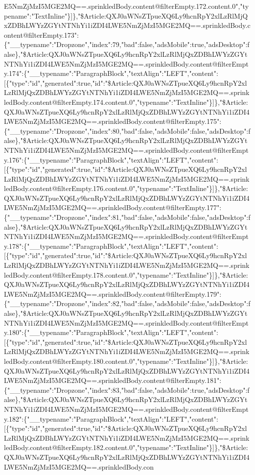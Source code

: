 E5NmZjMzI5MGE2MQ==.sprinkledBody.content@filterEmpty.172.content.0","typename":"TextInline"\}{]}\},"\$Article:QXJ0aWNsZTpueXQ6Ly9hcnRpY2xlLzRlMjQxZDBhLWYzZGYtNTNhYi1iZDI4LWE5NmZjMzI5MGE2MQ==.sprinkledBody.content@filterEmpty.173":\{"\_\_typename":"Dropzone","index":79,"bad":false,"adsMobile":true,"adsDesktop":false\},"\$Article:QXJ0aWNsZTpueXQ6Ly9hcnRpY2xlLzRlMjQxZDBhLWYzZGYtNTNhYi1iZDI4LWE5NmZjMzI5MGE2MQ==.sprinkledBody.content@filterEmpty.174":\{"\_\_typename":"ParagraphBlock","textAlign":"LEFT","content":{[}\{"type":"id","generated":true,"id":"\$Article:QXJ0aWNsZTpueXQ6Ly9hcnRpY2xlLzRlMjQxZDBhLWYzZGYtNTNhYi1iZDI4LWE5NmZjMzI5MGE2MQ==.sprinkledBody.content@filterEmpty.174.content.0","typename":"TextInline"\}{]}\},"\$Article:QXJ0aWNsZTpueXQ6Ly9hcnRpY2xlLzRlMjQxZDBhLWYzZGYtNTNhYi1iZDI4LWE5NmZjMzI5MGE2MQ==.sprinkledBody.content@filterEmpty.175":\{"\_\_typename":"Dropzone","index":80,"bad":false,"adsMobile":false,"adsDesktop":false\},"\$Article:QXJ0aWNsZTpueXQ6Ly9hcnRpY2xlLzRlMjQxZDBhLWYzZGYtNTNhYi1iZDI4LWE5NmZjMzI5MGE2MQ==.sprinkledBody.content@filterEmpty.176":\{"\_\_typename":"ParagraphBlock","textAlign":"LEFT","content":{[}\{"type":"id","generated":true,"id":"\$Article:QXJ0aWNsZTpueXQ6Ly9hcnRpY2xlLzRlMjQxZDBhLWYzZGYtNTNhYi1iZDI4LWE5NmZjMzI5MGE2MQ==.sprinkledBody.content@filterEmpty.176.content.0","typename":"TextInline"\}{]}\},"\$Article:QXJ0aWNsZTpueXQ6Ly9hcnRpY2xlLzRlMjQxZDBhLWYzZGYtNTNhYi1iZDI4LWE5NmZjMzI5MGE2MQ==.sprinkledBody.content@filterEmpty.177":\{"\_\_typename":"Dropzone","index":81,"bad":false,"adsMobile":false,"adsDesktop":false\},"\$Article:QXJ0aWNsZTpueXQ6Ly9hcnRpY2xlLzRlMjQxZDBhLWYzZGYtNTNhYi1iZDI4LWE5NmZjMzI5MGE2MQ==.sprinkledBody.content@filterEmpty.178":\{"\_\_typename":"ParagraphBlock","textAlign":"LEFT","content":{[}\{"type":"id","generated":true,"id":"\$Article:QXJ0aWNsZTpueXQ6Ly9hcnRpY2xlLzRlMjQxZDBhLWYzZGYtNTNhYi1iZDI4LWE5NmZjMzI5MGE2MQ==.sprinkledBody.content@filterEmpty.178.content.0","typename":"TextInline"\}{]}\},"\$Article:QXJ0aWNsZTpueXQ6Ly9hcnRpY2xlLzRlMjQxZDBhLWYzZGYtNTNhYi1iZDI4LWE5NmZjMzI5MGE2MQ==.sprinkledBody.content@filterEmpty.179":\{"\_\_typename":"Dropzone","index":82,"bad":false,"adsMobile":false,"adsDesktop":false\},"\$Article:QXJ0aWNsZTpueXQ6Ly9hcnRpY2xlLzRlMjQxZDBhLWYzZGYtNTNhYi1iZDI4LWE5NmZjMzI5MGE2MQ==.sprinkledBody.content@filterEmpty.180":\{"\_\_typename":"ParagraphBlock","textAlign":"LEFT","content":{[}\{"type":"id","generated":true,"id":"\$Article:QXJ0aWNsZTpueXQ6Ly9hcnRpY2xlLzRlMjQxZDBhLWYzZGYtNTNhYi1iZDI4LWE5NmZjMzI5MGE2MQ==.sprinkledBody.content@filterEmpty.180.content.0","typename":"TextInline"\}{]}\},"\$Article:QXJ0aWNsZTpueXQ6Ly9hcnRpY2xlLzRlMjQxZDBhLWYzZGYtNTNhYi1iZDI4LWE5NmZjMzI5MGE2MQ==.sprinkledBody.content@filterEmpty.181":\{"\_\_typename":"Dropzone","index":83,"bad":false,"adsMobile":true,"adsDesktop":false\},"\$Article:QXJ0aWNsZTpueXQ6Ly9hcnRpY2xlLzRlMjQxZDBhLWYzZGYtNTNhYi1iZDI4LWE5NmZjMzI5MGE2MQ==.sprinkledBody.content@filterEmpty.182":\{"\_\_typename":"ParagraphBlock","textAlign":"LEFT","content":{[}\{"type":"id","generated":true,"id":"\$Article:QXJ0aWNsZTpueXQ6Ly9hcnRpY2xlLzRlMjQxZDBhLWYzZGYtNTNhYi1iZDI4LWE5NmZjMzI5MGE2MQ==.sprinkledBody.content@filterEmpty.182.content.0","typename":"TextInline"\}{]}\},"\$Article:QXJ0aWNsZTpueXQ6Ly9hcnRpY2xlLzRlMjQxZDBhLWYzZGYtNTNhYi1iZDI4LWE5NmZjMzI5MGE2MQ==.sprinkledBody.con